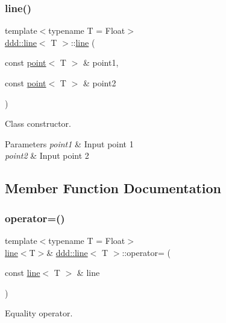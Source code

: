 \subsubsection{\texorpdfstring{line()}{line()}}
{\footnotesize\ttfamily template$<$typename T = Float$>$ \\
\hyperlink{classddd_1_1line}{ddd\+::line}$<$ T $>$\+::\hyperlink{classddd_1_1line}{line} (\begin{DoxyParamCaption}\item[{const \hyperlink{classddd_1_1point}{point}$<$ T $>$ \&}]{point1,  }\item[{const \hyperlink{classddd_1_1point}{point}$<$ T $>$ \&}]{point2 }\end{DoxyParamCaption})\hspace{0.3cm}{\ttfamily [inline]}}



Class constructor. 


\begin{DoxyParams}{Parameters}
{\em point1} & Input point 1 \\
\hline
{\em point2} & Input point 2 \\
\hline
\end{DoxyParams}


\subsection{Member Function Documentation}
\mbox{\label{classddd_1_1line_a22cb20bea375f801ada57f910f6d66e2}} 
\subsubsection{\texorpdfstring{operator=()}{operator=()}}
{\footnotesize\ttfamily template$<$typename T = Float$>$ \\
\hyperlink{classddd_1_1line}{line}$<$T$>$\& \hyperlink{classddd_1_1line}{ddd\+::line}$<$ T $>$\+::operator= (\begin{DoxyParamCaption}\item[{const \hyperlink{classddd_1_1line}{line}$<$ T $>$ \&}]{line }\end{DoxyParamCaption})\hspace{0.3cm}{\ttfamily [inline]}}



Equality operator. 


